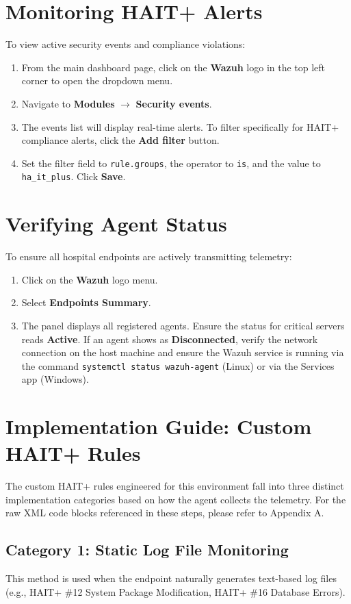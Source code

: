 \section{Monitoring HAIT+ Alerts}
To view active security events and compliance violations:
\begin{enumerate}
    \item From the main dashboard page, click on the \textbf{Wazuh} logo in the top left corner to open the dropdown menu.
    \item Navigate to \textbf{Modules} $\rightarrow$ \textbf{Security events}.
    \item The events list will display real-time alerts. To filter specifically for HAIT+ compliance alerts, click the \textbf{Add filter} button.
    \item Set the filter field to \texttt{rule.groups}, the operator to \texttt{is}, and the value to \texttt{ha\_it\_plus}. Click \textbf{Save}.
\end{enumerate}

\section{Verifying Agent Status}
To ensure all hospital endpoints are actively transmitting telemetry:
\begin{enumerate}
    \item Click on the \textbf{Wazuh} logo menu.
    \item Select \textbf{Endpoints Summary}.
    \item The panel displays all registered agents. Ensure the status for critical servers reads \textbf{Active}. If an agent shows as \textbf{Disconnected}, verify the network connection on the host machine and ensure the Wazuh service is running via the command \texttt{systemctl status wazuh-agent} (Linux) or via the Services app (Windows).
\end{enumerate}

\section{Implementation Guide: Custom HAIT+ Rules}
The custom HAIT+ rules engineered for this environment fall into three distinct implementation categories based on how the agent collects the telemetry. For the raw XML code blocks referenced in these steps, please refer to Appendix A.

\subsection{Category 1: Static Log File Monitoring}
This method is used when the endpoint naturally generates text-based log files (e.g., HAIT+ \#12 System Package Modification, HAIT+ \#16 Database Errors).

